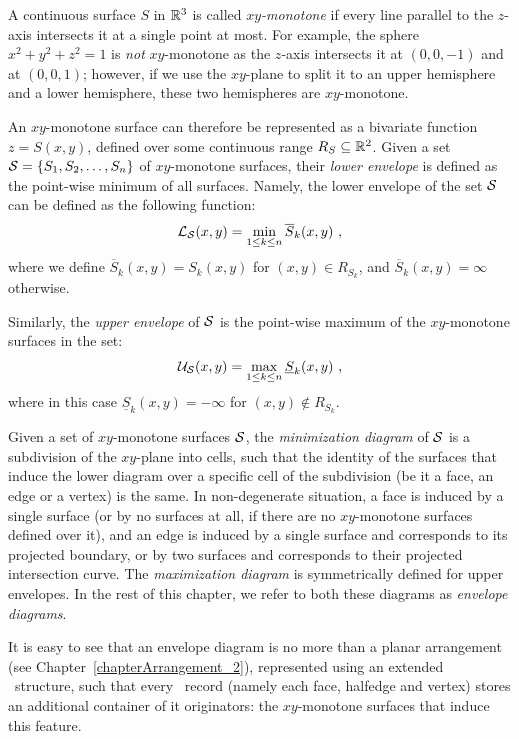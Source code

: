 
A continuous surface $S$ in $\mathbb{R}^3$ is called {\em $xy$-monotone} if
every line parallel to the $z$-axis intersects it at a single point
at most. For example, the sphere $x^2 + y^2 + z^2 = 1$ is {\em not}
$xy$-monotone as the $z$-axis intersects it at $(0, 0, -1)$ and at
$(0, 0, 1)$; however, if we use the $xy$-plane to split it to an
upper hemisphere and a lower hemisphere, these two hemispheres are
$xy$-monotone.

An $xy$-monotone surface can therefore be represented as a
bivariate function $z = S(x,y)$, defined over some continuous range
$R_S \subseteq \mathbb{R}^2$. Given a set ${\cal S} = \{ S_1, S_2, \ldots,
S_n \}$ of $xy$-monotone surfaces, their {\em lower envelope} is defined
as the point-wise minimum of all surfaces. Namely, the lower envelope
of the set ${\cal S}$ can be defined as the following function:
\begin{eqnarray*}
{\cal L}_{{\cal S}} (x,y) = \min_{1 \leq k \leq n}{\overline{S}_k (x,y)} \ ,
\end{eqnarray*}
where we define $\overline{S}_k(x,y) = S_k(x,y)$ for $(x,y) \in
R_{S_k}$, and $\overline{S}_k(x,y) = \infty$ otherwise.

Similarly, the {\em upper envelope} of ${\cal S}$ is the point-wise maximum of
the $xy$-monotone surfaces in the set:
\begin{eqnarray*}
{\cal U}_{{\cal S}} (x,y) = \max_{1 \leq k \leq n}{\underline{S}_k (x,y)} \ ,
\end{eqnarray*}
where in this case $\underline{S}_k(x,y) = -\infty$ for $(x,y) \nin
R_{S_k}$.

Given a set of $xy$-monotone surfaces ${\cal S}$, the {\em minimization
diagram} of ${\cal S}$ is a subdivision of the $xy$-plane into cells,
such that the identity of the surfaces that induce the lower diagram
over a specific cell of the subdivision (be it a face, an edge or
a vertex) is the same. In non-degenerate situation, a face is
induced by a single surface (or by no surfaces at all, if there are
no $xy$-monotone surfaces defined over it), and an edge is induced
by a single surface and corresponds to its projected boundary, or by
two surfaces and corresponds to their projected intersection curve.
The {\em maximization diagram} is symmetrically defined for upper envelopes.
In the rest of this chapter, we refer to both these diagrams as
{\em envelope diagrams}.

It is easy to see that an envelope diagram is no more than a planar
arrangement (see Chapter~\ref{chapterArrangement_2}), represented
using an extended \dcel\ structure, such that every \dcel\ record
(namely each face, halfedge and vertex) stores an additional container
of it originators: the $xy$-monotone surfaces that induce this feature.

